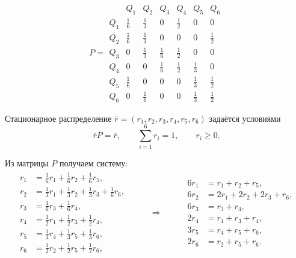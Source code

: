 \[
	P =
	\begin{array}{c|cccccc}
		    & Q_1          & Q_2          & Q_3          & Q_4          & Q_5          & Q_6          \\
		\hline
		Q_1 & \tfrac{1}{6} & \tfrac{1}{3} & 0            & \tfrac{1}{2} & 0            & 0            \\
		Q_2 & \tfrac{1}{6} & \tfrac{1}{3} & 0            & 0            & 0            & \tfrac{1}{2} \\
		Q_3 & 0            & \tfrac{1}{3} & \tfrac{1}{6} & \tfrac{1}{2} & 0            & 0            \\
		Q_4 & 0            & 0            & \tfrac{1}{6} & \tfrac{1}{2} & \tfrac{1}{3} & 0            \\
		Q_5 & \tfrac{1}{6} & 0            & 0            & 0            & \tfrac{1}{3} & \tfrac{1}{2} \\
		Q_6 & 0            & \tfrac{1}{6} & 0            & 0            & \tfrac{1}{3} & \tfrac{1}{2}
	\end{array}
\]


Стационарное распределение $\overline r=(r_1,r_2,r_3,r_4,r_5,r_6)$
задаётся условиями
\[
	\overline r P = \overline r,
	\qquad \sum_{i=1}^6 r_i = 1,
	\qquad r_i \ge 0.
\]

Из матрицы $P$ получаем систему:
\[
	\begin{array}{rcl}
		\begin{aligned}
			r_1 & = \tfrac{1}{6}r_1 + \tfrac{1}{6}r_2 + \tfrac{1}{6}r_5,                   \\
			r_2 & = \tfrac{1}{3}r_1 + \tfrac{1}{3}r_2 + \tfrac{1}{3}r_3 + \tfrac{1}{6}r_6, \\
			r_3 & = \tfrac{1}{6}r_3 + \tfrac{1}{6}r_4,                                     \\
			r_4 & = \tfrac{1}{2}r_1 + \tfrac{1}{2}r_3 + \tfrac{1}{2}r_4,                   \\
			r_5 & = \tfrac{1}{3}r_4 + \tfrac{1}{3}r_5 + \tfrac{1}{3}r_6,                   \\
			r_6 & = \tfrac{1}{2}r_2 + \tfrac{1}{2}r_5 + \tfrac{1}{2}r_6,
		\end{aligned}
		 & \qquad \Rightarrow \qquad &
		\begin{aligned}
			6r_1 & = r_1 + r_2 + r_5,          \\
			6r_2 & = 2r_1 + 2r_2 + 2r_3 + r_6, \\
			6r_3 & = r_3 + r_4,                \\
			2r_4 & = r_1 + r_3 + r_4,          \\
			3r_5 & = r_4 + r_5 + r_6,          \\
			2r_6 & = r_2 + r_5 + r_6.
		\end{aligned}
	\end{array}
\]

